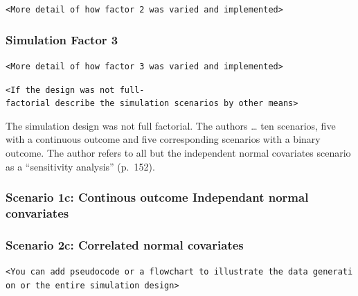 \documentclass[10,a4paperpaper,]{article}
\begin{document}
\texttt{\textless{}More\ detail\ of\ how\ factor\ 2\ was\ varied\ and\ implemented\textgreater{}}

\subsubsection{Simulation Factor 3}

\texttt{\textless{}More\ detail\ of\ how\ factor\ 3\ was\ varied\ and\ implemented\textgreater{}}

\texttt{\textless{}If\ the\ design\ was\ not\ full-factorial\ describe\ the\ simulation\ scenarios\ by\ other\ means\textgreater{}}

The simulation design was not full factorial. The authors \ldots{} ten
scenarios, five with a continuous outcome and five corresponding
scenarios with a binary outcome. The author refers to all but the
independent normal covariates scenario as a ``sensitivity analysis''
(p.~152).

\subsubsection{Scenario 1c: Continous outcome Independant normal convariates}

\subsubsection{Scenario 2c: Correlated normal covariates}

\texttt{\textless{}You\ can\ add\ pseudocode\ or\ a\ flowchart\ to\ illustrate\ the\ data\ generation\ or\ the\ entire\ simulation\ design\textgreater{}}
\end{document}

